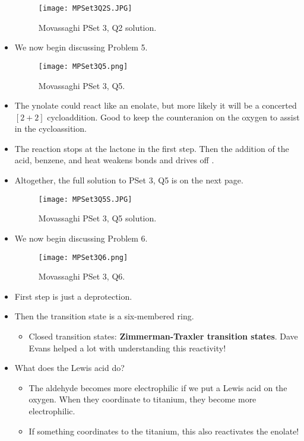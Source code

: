 \documentclass[../notes.tex]{subfiles}
\begin{document}
\begin{itemize}
\begin{figure}[H]
        \centering
        \texttt{[image: MPSet3Q2S.JPG]}
        \caption{Movassaghi PSet 3, Q2 solution.}
        \label{fig:MPSet3Q2S}
    \end{figure}
    \pagebreak
    \item We now begin discussing Problem 5.
    \begin{figure}[h!]
        \centering
        \texttt{[image: MPSet3Q5.png]}
        \caption{Movassaghi PSet 3, Q5.}
        \label{fig:MPSet3Q5}
    \end{figure}
    \item The ynolate could react like an enolate, but more likely it will be a concerted $[2+2]$ cycloaddition. Good to keep the counteranion on the oxygen to assist in the cycloassition.
    \item The reaction stops at the lactone in the first step. Then the addition of the acid, benzene, and heat weakens bonds and drives off .
    \item Altogether, the full solution to PSet 3, Q5 is on the next page.
    \begin{figure}[h!]
        \centering
        \texttt{[image: MPSet3Q5S.JPG]}
        \caption{Movassaghi PSet 3, Q5 solution.}
        \label{fig:MPSet3Q5S}
    \end{figure}
    \pagebreak
    \item We now begin discussing Problem 6.
    \begin{figure}[h!]
        \centering
        \texttt{[image: MPSet3Q6.png]}
        \caption{Movassaghi PSet 3, Q6.}
        \label{fig:MPSet3Q6}
    \end{figure}
    \item First step is just a deprotection.
    \item Then the transition state is a six-membered ring.
    \begin{itemize}
        \item Closed transition states: \textbf{Zimmerman-Traxler transition states}. Dave Evans helped a lot with understanding this reactivity!
    \end{itemize}
    \item What does the Lewis acid do?
    \begin{itemize}
        \item The aldehyde becomes more electrophilic if we put a Lewis acid on the oxygen. When they coordinate to titanium, they become more electrophilic.
        \item If something coordinates to the titanium, this also reactivates the enolate!

\end{itemize}
\end{itemize}
\end{document}
